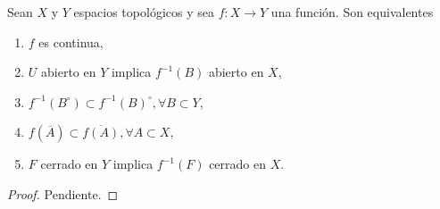 
\begin{theorem}
Sean $X$ y $Y$ espacios topológicos y sea $f : X \longrightarrow Y$ una función. Son equivalentes
\begin{enumerate}[label=\textnormal{(\roman*)}, align=left, labelwidth=1.7em, leftmargin=3.0em]
\item $f$ es continua,
\item $U$ abierto en $Y$ implica $f^{-1}(B)$ abierto en $X$,
\item $f^{-1}(B^\circ) \subset f^{-1}(B)^\circ, \forall B \subset Y$,
\item $f(\overline{A}) \subset \overline{f(A)}, \forall A \subset X$,
\item $F$ cerrado en $Y$ implica $f^{-1}(F)$ cerrado en $X$. 
\end{enumerate}
\end{theorem}

\begin{proof}
Pendiente.
\end{proof}
